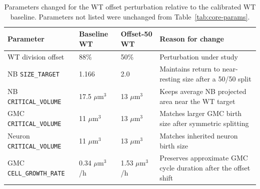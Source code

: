 \begin{table}[!htbp]
\centering
\caption{Parameters changed for the WT offset perturbation relative to the calibrated WT baseline. Parameters not listed were unchanged from Table~\ref{tab:core-params}.}
\label{tab:offset-params}
\begin{tabular}{p{4.5cm}p{2.3cm}p{2.3cm}p{5.2cm}}
\toprule
Parameter & Baseline WT & Offset-50 WT & Reason for change \\
\midrule
WT division offset & 88\% & 50\% & Perturbation under study \\
NB \texttt{SIZE\_TARGET} & 1.166 & 2.0 & Maintains return to near-resting size after a 50/50 split \\
NB \texttt{CRITICAL\_VOLUME} & 17.5 \(\mu\mathrm{m}^3\) & 13 \(\mu\mathrm{m}^3\) & Keeps average NB projected area near the WT target \\
GMC \texttt{CRITICAL\_VOLUME} & 11 \(\mu\mathrm{m}^3\) & 13 \(\mu\mathrm{m}^3\) & Matches larger GMC birth size after symmetric splitting \\
Neuron \texttt{CRITICAL\_VOLUME} & 11 \(\mu\mathrm{m}^3\) & 13 \(\mu\mathrm{m}^3\) & Matches inherited neuron birth size \\
GMC \texttt{CELL\_GROWTH\_RATE} & 0.34 \(\mu\mathrm{m}^3\)/h & 1.53 \(\mu\mathrm{m}^3\)/h & Preserves approximate GMC cycle duration after the offset shift \\
\bottomrule
\end{tabular}
\end{table}


